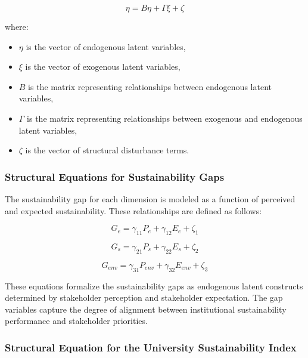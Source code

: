 \documentclass[11pt,a4paper]{article}
\begin{document}
\begin{equation}
\eta = B \eta + \Gamma \xi + \zeta
\end{equation}

where:

\begin{itemize}
\item $\eta$ is the vector of endogenous latent variables,
\item $\xi$ is the vector of exogenous latent variables,
\item $B$ is the matrix representing relationships between endogenous latent variables,
\item $\Gamma$ is the matrix representing relationships between exogenous and endogenous latent variables,
\item $\zeta$ is the vector of structural disturbance terms.
\end{itemize}

\subsubsection{Structural Equations for Sustainability Gaps}

The sustainability gap for each dimension is modeled as a function of perceived and expected sustainability. These relationships are defined as follows:

\begin{equation}
G_e = \gamma_{11} P_e + \gamma_{12} E_e + \zeta_1
\end{equation}

\begin{equation}
G_s = \gamma_{21} P_s + \gamma_{22} E_s + \zeta_2
\end{equation}

\begin{equation}
G_{env} = \gamma_{31} P_{env} + \gamma_{32} E_{env} + \zeta_3
\end{equation}

These equations formalize the sustainability gaps as endogenous latent constructs determined by stakeholder perception and stakeholder expectation. The gap variables capture the degree of alignment between institutional sustainability performance and stakeholder priorities.

\subsubsection{Structural Equation for the University Sustainability Index}
\end{document}
